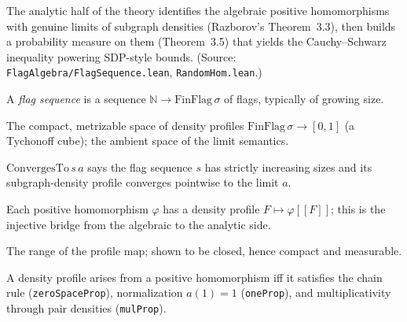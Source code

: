 The analytic half of the theory identifies the algebraic positive homomorphisms
with genuine limits of subgraph densities (Razborov's Theorem~3.3), then builds a
probability measure on them (Theorem~3.5) that yields the Cauchy--Schwarz
inequality powering SDP-style bounds. (Source:
\texttt{FlagAlgebra/FlagSequence.lean}, \texttt{RandomHom.lean}.)

\begin{definition}
  \label{def:flag-seq}
  \leanok
  A \emph{flag sequence} is a sequence $\mathbb{N} \to \mathrm{FinFlag}\,\sigma$
  of flags, typically of growing size.
\end{definition}

\begin{definition}
  \label{def:flag-density-space}
  \leanok
  The compact, metrizable space of density profiles $\mathrm{FinFlag}\,\sigma \to
  [0,1]$ (a Tychonoff cube); the ambient space of the limit semantics.
\end{definition}

\begin{definition}[Convergence]
  \label{def:converges-to}
  \leanok
  $\mathrm{ConvergesTo}\,s\,a$ says the flag sequence $s$ has strictly increasing
  sizes and its subgraph-density profile converges pointwise to the limit $a$.
\end{definition}

\begin{definition}
  \label{def:positive-hom-coe}
  \leanok
  Each positive homomorphism $\varphi$ has a density profile
  $F \mapsto \varphi[\![F]\!]$; this is the injective bridge from the algebraic
  to the analytic side.
\end{definition}

\begin{definition}
  \label{def:positive-hom-space}
  \leanok
  The range of the profile map; shown to be closed, hence compact and
  measurable.
\end{definition}

\begin{theorem}
  \label{thm:positive-hom-space-char}
  \leanok
  A density profile arises from a positive homomorphism iff it satisfies the
  chain rule (\texttt{zeroSpaceProp}), normalization $a(1)=1$ (\texttt{oneProp}),
  and multiplicativity through pair densities (\texttt{mulProp}).
\end{theorem}

